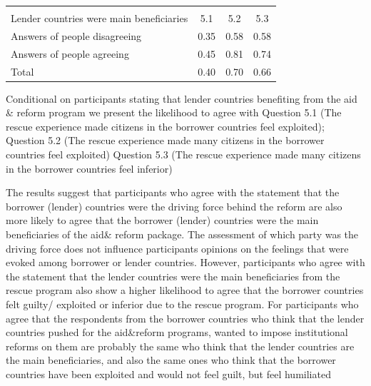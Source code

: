 \begin{table}[h!]
   \begin{center}
\begin{tabular}{l*{1}{ccc}}
\hline\hline
                    &\multicolumn{3}{c}{}                  \\
Lender countries were main beneficiaries                    &  5.1 &  5.2 &  5.3 \\
\hline
Answers of people disagreeing           &        0.35&        0.58&        0.58\\
Answers of people agreeing                   &        0.45&        0.81&        0.74\\
\hline
Total               &        0.40&        0.70&        0.66\\
\hline\hline
\end{tabular}
\end{center} 
\begin{tablenotes}
\item \tiny
Conditional on participants stating that lender countries benefiting from the aid & reform program we present the likelihood to agree with Question 5.1 (The rescue experience made citizens in the borrower countries feel exploited); Question 5.2 (The rescue experience made many citizens in the borrower countries feel exploited) Question 5.3 (The rescue experience made many citizens in the borrower countries feel inferior)
\end{tablenotes}
\end{table}
The results suggest that participants who agree with the statement that the borrower (lender) countries were the driving force behind the reform are also more likely to agree that the borrower (lender) countries were the main beneficiaries of the aid& reform package. The assessment of which party was the driving force does not influence participants opinions on the feelings that were evoked among borrower or lender countries. However, participants who agree with the statement that the lender countries were the main beneficiaries from the rescue program also show a higher likelihood to agree that the borrower countries felt guilty/ exploited or inferior due to the rescue program. For participants who agree that the 
respondents from the borrower countries who think that the lender countries
pushed for the aid\&reform programs, wanted to impose institutional reforms
on them are probably the same who think that the lender countries are the
main beneficiaries, and also the same ones who think that the borrower
countries have been exploited and would not feel guilt, but feel humiliated
